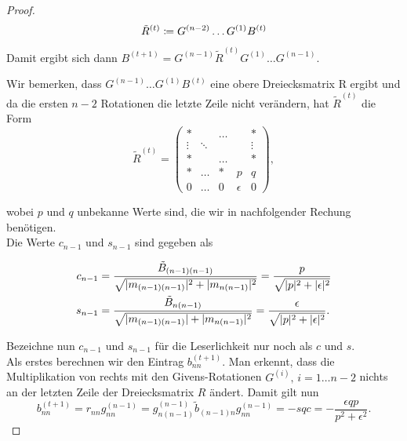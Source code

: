 \documentclass{article}
\begin{document}
\begin{proof}
	\begin{equation*}
		\tilde{R}^{(t)} \coloneqq G^{(n-2)} \dots G^{(1)} B^{(t)}\\
	\end{equation*}


	Damit ergibt sich dann $B^{(t+1)} = G^{(n-1)} \tilde{R}^{(t)} G^{(1)} \dots G^{(n-1)}$.

	Wir bemerken, dass $G^{(n-1)} \dots G^{(1)} B^{(t)}$ eine obere Dreiecksmatrix R ergibt und da die ersten $n-2$ Rotationen die letzte Zeile nicht verändern, hat $\tilde{R}^{(t)}$ die Form
	\begin{equation}
		\tilde{R}^{(t)} = \left(\begin{array}{rrrrr}
			* & &\dots & & *\\
			\vdots & \ddots & & & \vdots\\
			* & &\dots & & *\\
			* & \dots&  *& p& q\\
			0 & \dots & 0 & \epsilon & 0
		\end{array}\right),
	\end{equation}

	wobei $p$ und $q$ unbekanne Werte sind, die wir in nachfolgender Rechung benötigen.\\
	Die Werte $c_{n-1}$ und $s_{n-1}$ sind gegeben als

	\begin{equation*}
		\begin{aligned}
			c_{n-1} &= \frac{\tilde{B}_{(n-1)(n-1)}}{\sqrt{|m_{(n-1)(n-1)}|^2 + |m_{n(n-1)}|^2}} = \frac{p}{\sqrt{|p|^2 +|\epsilon|^2}} \\ s_{n-1} &= \frac{\tilde{B}_{n(n-1)}}{\sqrt{|m_{(n-1)(n-1)}| + |m_{n(n-1)}|^2}} =  \frac{\epsilon}{\sqrt{|p|^2 +|\epsilon|^2}}.
		\end{aligned}\\
	\end{equation*}

	Bezeichne nun $c_{n-1}$ und $s_{n-1}$ für die Leserlichkeit nur noch als $c$ und $s$.\\

	Als erstes berechnen wir den Eintrag $b^{(t+1)}_{nn}$. Man erkennt, dass die Multiplikation von rechts mit den Givens-Rotationen $G^{(i)}, \, i = 1\dots n-2$ nichts an der letzten Zeile der Dreiecksmatrix $R$ ändert. Damit gilt nun
	\begin{equation*}
		b^{(t+1)}_{nn} = r_{nn} g^{(n-1)}_{nn} = g^{(n-1)}_{n(n-1)} \tilde{b}_{(n-1)n} g^{(n-1)}_{nn}  = -sqc = - \frac{\epsilon qp }{p^2+\epsilon^2}.
	\end{equation*}


\end{proof}
\end{document}
